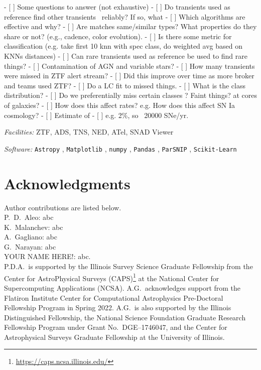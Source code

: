 \documentclass[twocolumn]{aastex63}
\begin{document}
- [ ] Some questions to answer (not exhaustive)
    - [ ] Do transients used as reference find other transients ~reliably? If so, what %
        - [ ] Which algorithms are effective and why?
        - [ ] Are matches same/similar types? What properties do they share or not? (e.g., cadence, color evolution).
            - [ ] Is there some metric for classification (e.g. take first 10 knn with spec class, do weighted avg based on KNNs distances)
        - [ ] Can rare transients used as reference be used to find rare things?
        - [ ] Contamination of AGN and variable stars?
    - [ ] How many transients were missed in ZTF alert stream? 
        - [ ] Did this improve over time as more broker and teams used ZTF?
        - [ ] Do a LC fit to missed things.
            - [ ] What is the class distribution? 
            - [ ] Do we preferentially miss certain classes ? Faint things? at cores of galaxies?
                - [ ] How does this affect rates? e.g. How does this affect SN Ia cosmology?
        - [ ] Estimate of %
            - [ ] e.g. 2\%, so ~20000 SNe/yr.


\textit{Facilities:} ZTF, ADS, TNS, NED, ATel, SNAD Viewer

\textit{Software:}
\texttt{Astropy} \citep{astropy:2013, astropy:2018}, \texttt{Matplotlib} \citep{hunter2007matplotlib}, \texttt{numpy} \citep{walt2011_numpy}, \texttt{Pandas} \citep{reback2020_pandas}, \texttt{ParSNIP} \citep{Boone2021}, \texttt{Scikit-Learn} \citep{scikit-learn}

\section{Acknowledgments} \label{sec:acknowledgments}

Author contributions are listed below. \\

P.~D.~Aleo: abc \\
K.~Malanchev: abc \\ %
A.~Gagliano: abc \\ %
G.~Narayan: abc \\ %
YOUR NAME HERE!: abc. \\ %

P.D.A.\ is supported by the Illinois Survey Science Graduate Fellowship from the Center for AstroPhysical Surveys (CAPS)\footnote{\url{https://caps.ncsa.illinois.edu/}} at the National Center for Supercomputing Applications (NCSA). 
A.G.\ acknowledges support from the Flatiron Institute Center for Computational Astrophysics Pre-Doctoral Fellowship Program in Spring 2022. A.G.\ is also supported by the Illinois Distinguished Fellowship, the National Science Foundation Graduate Research Fellowship Program under Grant No.\ DGE--1746047, and the Center for Astrophysical Surveys Graduate Fellowship at the University of Illinois.
\end{document}
